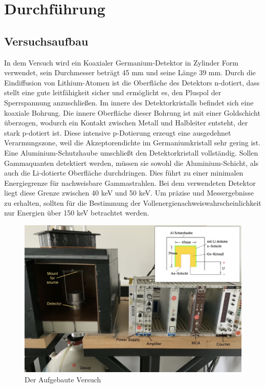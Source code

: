 \section{Durchführung}
\label{sec:Durchführung und Aufbau }
\subsection{Versuchsaufbau}

In dem Versuch wird ein Koaxialer Germanium-Detektor in Zylinder Form verwendet, sein Durchmesser beträgt 45 mm und
seine Länge 39 mm. Durch die Eindiffusion von Lithium-Atomen ist die Oberfläche des Detektors n-dotiert, dass stellt
eine gute leitfähigkeit sicher und ermöglicht es, den Pluspol der Sperrspannung anzuschließen.
Im innere des Detektorkristalls befindet sich eine koaxiale Bohrung. Die innere Oberfläche dieser Bohrung ist mit einer 
Goldschicht überzogen, wodurch ein Kontakt zwischen Metall und Halbleiter entsteht, der stark p-dotiert ist. Diese 
intensive p-Dotierung erzeugt eine ausgedehnet Verarmungszone, weil die Akzeptorendichte im Germaniumkristall sehr gering ist.
Eine Aluminium-Schutzhaube umschließt den Detektorkristall vollständig. Sollen Gammaquanten detektiert werden, müssen sie sowohl 
die Aluminium-Schicht, als auch die Li-dotierte Oberfläche durchdringen. Dies führt zu einer minimalen Energiegrenze für nachweisbare
Gammastrahlen. Bei dem verwendeten Detektor liegt diese Grenze zwischen 40 keV und 50 keV. Um präzise und Messergebnisse zu erhalten, 
sollten für die Bestimmung der Vollenergienachweiswahrscheinlichkeit nur Energien über 150 keV betrachtet werden.


\begin{figure}
    \includegraphics[width=\textwidth]{bilder/aufbau.jpg}
    \caption{Der Aufgebaute Versuch}
\end{figure}

